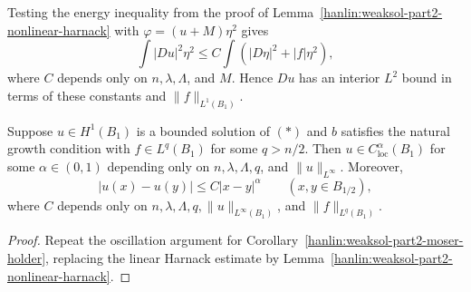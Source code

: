 \begin{remark}\label{hanlin:weaksol-part2-nonlinear-gradient-estimate}
Testing the energy inequality from the proof of
Lemma~\ref{hanlin:weaksol-part2-nonlinear-harnack} with
$\varphi=(u+M)\eta^2$ gives
\[
\int|Du|^2\eta^2
\leq C\int(|D\eta|^2+|f|\eta^2),
\]
where $C$ depends only on $n,\lambda,\Lambda$, and $M$. Hence $Du$ has an
interior $L^2$ bound in terms of these constants and
$\|f\|_{L^1(B_1)}$.
\end{remark}

\begin{corollary}\label{hanlin:weaksol-part2-nonlinear-holder}
Suppose $u\in H^1(B_1)$ is a bounded solution of $(\ast)$ and $b$ satisfies
the natural growth condition with $f\in L^q(B_1)$ for some $q>n/2$.
Then $u\in C^\alpha_{\mathrm{loc}}(B_1)$ for some $\alpha\in(0,1)$
depending only on $n,\lambda,\Lambda,q$, and $\|u\|_{L^\infty}$. Moreover,
\[
|u(x)-u(y)|\leq C|x-y|^\alpha
\qquad(x,y\in B_{1/2}),
\]
where $C$ depends only on
$n,\lambda,\Lambda,q,\|u\|_{L^\infty(B_1)}$, and
$\|f\|_{L^q(B_1)}$.
\end{corollary}
\begin{proof}
\sketch Repeat the oscillation argument for
Corollary~\ref{hanlin:weaksol-part2-moser-holder}, replacing the linear
Harnack estimate by Lemma~\ref{hanlin:weaksol-part2-nonlinear-harnack}.
\end{proof}

